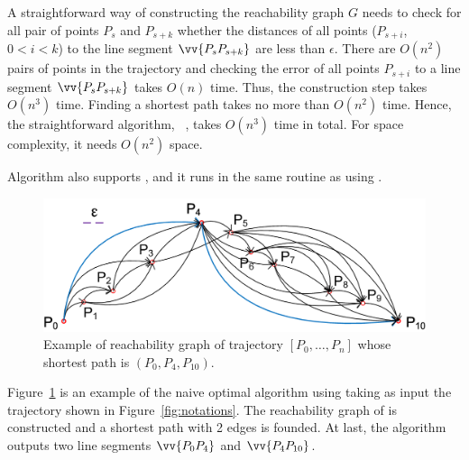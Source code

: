 A straightforward way of constructing the reachability graph $G$ needs to check for all pair of points $P_s$ and $P_{s+k}$ whether the distances of all points ($P_{s+i}$, $0<i<k$) to the line segment $\vv{P_sP_{s+k}}$ are less than $\epsilon$.
There are $O(n^2)$ pairs of points in the trajectory and checking the error of all points $P_{s+i}$ to a line segment $\vv{P_sP_{s+k}}$ takes $O(n)$ time.
Thus, the construction step takes $O(n^3)$ time.
Finding a shortest path takes no more than $O(n^2)$ time. Hence, the straightforward algorithm, \ie~\opt, takes $O(n^3)$ time in total.
For space complexity, it needs $O(n^2)$ space.

Algorithm \opt also supports \sed, and it runs in the same routine as using \ped.

\begin{figure}[tb!]
	\centering
	\includegraphics[scale=0.75]{Figures/Fig-Optimal.png}
	\vspace{-2ex}
	\caption{\small Example of reachability graph of trajectory $[P_0, \ldots, P_n]$ whose shortest path is $(P_0, P_4, P_{10})$.}
	\vspace{-2ex}
	\label{fig:optimal}
\end{figure}

\begin{example}
	\label{exm-alg-optimal}
	Figure~\ref{fig:optimal} is an example of the naive optimal algorithm using \ped taking as input the trajectory  shown in Figure~\ref{fig:notations}. The reachability graph of  is constructed and a shortest path with 2 edges is founded. 
	At last, the algorithm outputs two line segments $\vv{P_0P_4}$ and $\vv{P_4P_{10}}$.	
\end{example}
\vspace{-1ex}

